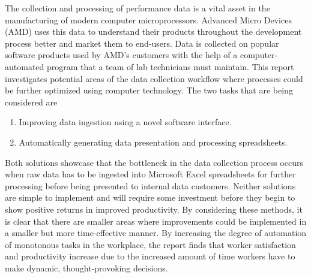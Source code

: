 \documentclass[12pt]{article}
\begin{document}



\toc 










\indent\hspace{0.5in} The collection and processing of performance data is a vital asset in the manufacturing of modern computer microprocessors. Advanced Micro Devices (AMD) uses this data to understand their products throughout the development process better and market them to end-users. Data is collected on popular software products used by AMD's customers with the help of a computer-automated program that a team of lab technicians must maintain. This report investigates potential areas of the data collection workflow where processes could be further optimized using computer technology. The two tasks that are being considered are

\begin{enumerate}
\item Improving data ingestion using a novel software interface.
\item Automatically generating data presentation and processing spreadsheets.
\end{enumerate}

\indent\hspace{0.5in} Both solutions showcase that the bottleneck in the data collection process occurs when raw data has to be ingested into Microsoft Excel spreadsheets for further processing before being presented to internal data customers. Neither solutions are simple to implement and will require some investment before they begin to show positive returns in improved productivity. By considering these methods, it is clear that there are smaller areas where improvements could be implemented in a smaller but more time-effective manner. By increasing the degree of automation of monotonous tasks in the workplace, the report finds that worker satisfaction and productivity increase due to the increased amount of time workers have to make dynamic, thought-provoking decisions.
\end{document}
